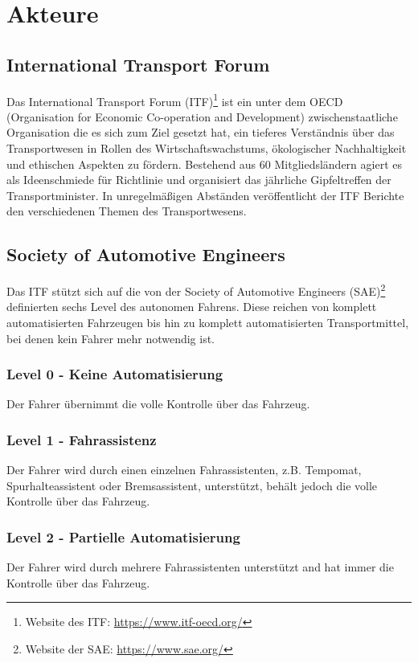 \section{Akteure}

\subsection{International Transport Forum}


Das International Transport Forum (ITF)\footnote{Website des ITF: \url{https://www.itf-oecd.org/}} ist ein unter dem OECD (Organisation for Economic Co-operation and Development) zwischenstaatliche Organisation die es sich zum Ziel gesetzt hat, ein tieferes Verständnis über das Transportwesen in Rollen des Wirtschaftswachstums, ökologischer Nachhaltigkeit und ethischen Aspekten zu fördern. Bestehend aus 60 Mitgliedsländern agiert es als Ideenschmiede für Richtlinie und organisiert das jährliche Gipfeltreffen der Transportminister. In unregelmäßigen Abständen veröffentlicht der ITF Berichte den verschiedenen Themen des Transportwesens.

\subsection{Society of Automotive Engineers}

\cite{standardSAE}\cite{smith2015automated} Das ITF stützt sich auf die von der Society of Automotive Engineers (SAE)\footnote{Website der SAE: \url{https://www.sae.org/}}  definierten sechs Level des autonomen Fahrens. Diese reichen von komplett automatisierten Fahrzeugen bis hin zu komplett automatisierten Transportmittel, bei denen kein Fahrer mehr notwendig ist.\\

\subsubsection{Level 0 - Keine Automatisierung}
Der Fahrer übernimmt die volle Kontrolle über das Fahrzeug.

\subsubsection{Level 1 - Fahrassistenz}
Der Fahrer wird durch einen einzelnen Fahrassistenten, z.B. Tempomat, Spurhalteassistent oder Bremsassistent, unterstützt, behält jedoch die volle Kontrolle über das Fahrzeug.

\subsubsection{Level 2 - Partielle Automatisierung} 
Der Fahrer wird durch mehrere Fahrassistenten unterstützt and hat immer die Kontrolle über das Fahrzeug.
    

